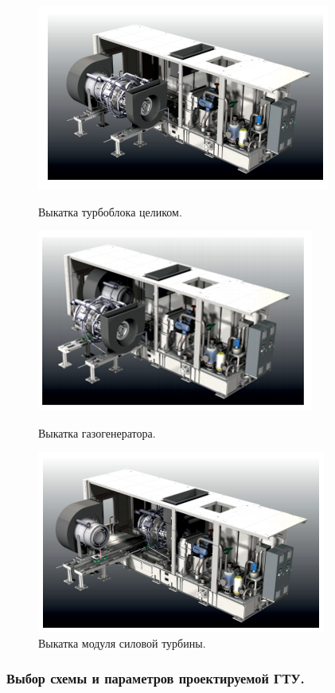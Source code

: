 \documentclass[a4paper,12pt]{article}
\begin{document}
    \begin{figure}[h!]
        \centering
        \includegraphics[scale=1.0]{./pictures/T16_tb_roll-out.png}
        \caption{Выкатка турбоблока целиком.}
        \label{pic_t16_tb_roll_out}
        \includegraphics[scale=1.0]{./pictures/T16_gg_roll-out.png}
        \caption{Выкатка газогенератора.}
        \label{pic_t16_gg_roll_out}
        \includegraphics[scale=1.0]{./pictures/T16_pt_rool-out.png}
        \caption{Выкатка модуля силовой турбины.}
        \label{pic_t16_pt_roll_out}
    \end{figure}


    \subsubsection{Выбор схемы и параметров проектируемой ГТУ.}
\end{document}

